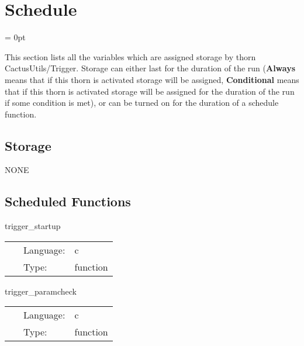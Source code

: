 
\section{Schedule} 


\parskip = 0pt


\noindent This section lists all the variables which are assigned storage by thorn CactusUtils/Trigger.  Storage can either last for the duration of the run ({\bf Always} means that if this thorn is activated storage will be assigned, {\bf Conditional} means that if this thorn is activated storage will be assigned for the duration of the run if some condition is met), or can be turned on for the duration of a schedule function.


\subsection*{Storage}NONE
\subsection*{Scheduled Functions}
\vspace{5mm}


\hspace{5mm} trigger\_startup 

\hspace{5mm}{\it startup routine } 


\hspace{5mm}

 \begin{tabular*}{160mm}{cll} 
~ & Language:  & c \\ 
~ & Type:  & function \\ 
\end{tabular*} 


\vspace{5mm}


\hspace{5mm} trigger\_paramcheck 

\hspace{5mm}{\it parameter checking } 


\hspace{5mm}

 \begin{tabular*}{160mm}{cll} 
~ & Language:  & c \\ 
~ & Type:  & function \\ 
\end{tabular*} 


